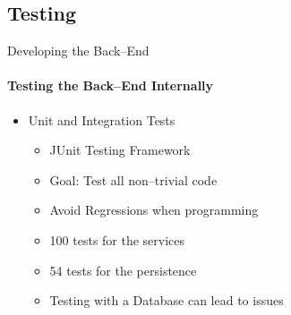     \subsection{Testing}
        \begin{frame}[t]{Developing the Back--End}\framesubtitle{Testing the Back--End Internally}
            \begin{itemize}
                \item Unit and Integration Tests
                \begin{itemize}
                    \item JUnit Testing Framework
                    \item Goal: Test all non--trivial code
                    \item Avoid Regressions when programming
                    \item 100 tests for the services
                    \item 54 tests for the persistence
                    \item Testing with a Database can lead to issues
                \end{itemize}
            \end{itemize}
\end{frame}
